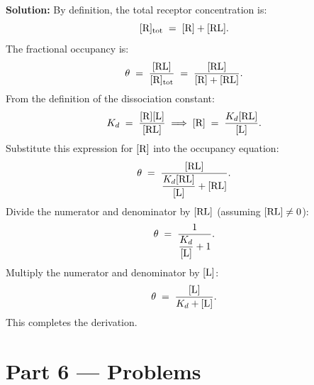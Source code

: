 \documentclass[12pt, a4paper]{book}
\begin{document}
\begin{problembox}
\begin{enumerate}[label=\textbf{E\arabic*.}]
        \textbf{Solution:}
        By definition, the total receptor concentration is:
        \[
          [\ce{R}]_{\text{tot}} \;=\; [\ce{R}] + [\ce{RL}].
        \]
        The fractional occupancy is:
        \[
          \theta \;=\; \frac{[\ce{RL}]}{[\ce{R}]_{\text{tot}}} \;=\; \frac{[\ce{RL}]}{[\ce{R}] + [\ce{RL}]}.
        \]
        From the definition of the dissociation constant:
        \[
          K_d \;=\; \frac{[\ce{R}][\ce{L}]}{[\ce{RL}]} \implies [\ce{R}] \;=\; \frac{K_d [\ce{RL}]}{[\ce{L}]}.
        \]
        Substitute this expression for $[\ce{R}]$ into the occupancy equation:
        \[
          \theta \;=\; \frac{[\ce{RL}]}{\dfrac{K_d [\ce{RL}]}{[\ce{L}]} + [\ce{RL}]}.
        \]
        Divide the numerator and denominator by $[\ce{RL}]$ (assuming $[\ce{RL}] \neq 0$):
        \[
          \theta \;=\; \frac{1}{\dfrac{K_d}{[\ce{L}]} + 1}.
        \]
        Multiply the numerator and denominator by $[\ce{L}]$:
        \[
          \theta \;=\; \frac{[\ce{L}]}{K_d + [\ce{L}]}.
        \]
        This completes the derivation.
\end{enumerate}
\end{problembox}

\newpage

\section{Part 6 --- Problems}
\end{document}
